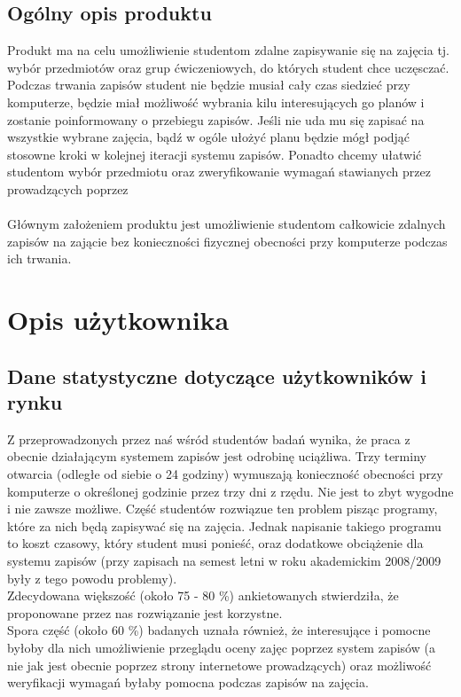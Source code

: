\documentclass[11pt,leqno]{article}
\begin{document}
\subsection{Ogólny opis produktu}
Produkt ma na celu umożliwienie studentom zdalne zapisywanie się na zajęcia tj. wybór przedmiotów oraz grup ćwiczeniowych, do których student chce uczęsczać. Podczas trwania zapisów student nie będzie musiał cały czas siedzieć przy komputerze, będzie miał możliwość wybrania kilu interesujących go planów i zostanie poinformowany o przebiegu zapisów. Jeśli nie uda mu się zapisać na wszystkie wybrane zajęcia, bądź w ogóle ułożyć planu będzie mógł podjąć stosowne kroki w kolejnej iteracji systemu zapisów. Ponadto chcemy ułatwić studentom wybór przedmiotu oraz zweryfikowanie wymagań stawianych przez prowadzących poprzez 
\\ \\
Głównym założeniem produktu jest umożliwienie studentom całkowicie zdalnych zapisów na zającie bez konieczności fizycznej obecności przy komputerze podczas ich trwania.

\section{Opis użytkownika}

\subsection{Dane statystyczne dotyczące użytkowników i rynku}
Z przeprowadzonych przez naś wśród studentów badań wynika, że praca z obecnie działającym systemem zapisów jest odrobinę uciążliwa. Trzy terminy otwarcia (odległe od siebie o 24 godziny) wymuszają konieczność obecności przy komputerze o określonej godzinie przez trzy dni z rzędu. Nie jest to zbyt wygodne i nie zawsze możliwe. Część studentów rozwiązue ten problem pisząc programy, które za nich będą zapisywać się na zajęcia. Jednak napisanie takiego programu to koszt czasowy, który student musi ponieść, oraz dodatkowe obciążenie dla systemu zapisów (przy zapisach na semest letni w roku akademickim 2008/2009 były z tego powodu problemy). \\
Zdecydowana większość (około 75 - 80 \%) ankietowanych stwierdziła, że proponowane przez nas rozwiązanie jest korzystne. \\
Spora część (około 60 \%) badanych uznała również, że interesujące  i pomocne byłoby dla nich umożliwienie przeglądu oceny zajęc poprzez system zapisów (a nie jak jest obecnie poprzez strony internetowe prowadzących) oraz możliwość weryfikacji wymagań byłaby pomocna podczas zapisów na zajęcia.
\end{document}
